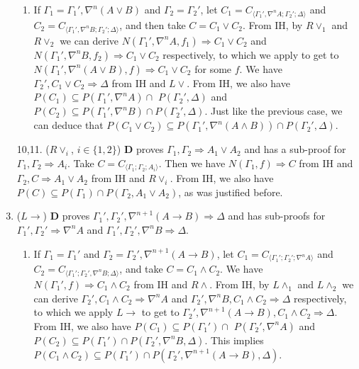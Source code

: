 \begin{enumerate}
\begin{enumerate}
		\item If $\Gamma_1 = \Gamma_1' , \nabla^n (A \lor B)$ and $\Gamma_2 = \Gamma_2'$, let $C_1 = C_{\langle\Gamma_1',\nabla^n A;\Gamma_2';\Delta\rangle}$ and $C_2 = C_{\langle\Gamma_1',\nabla^n B;\Gamma_2';\Delta\rangle}$, and then take $C = C_1 \lor C_2$.
		From IH, by $R\lor_1$ and $R\lor_2$ we can derive $N(\Gamma_1',\nabla^n A,f_1) \Rightarrow C_1 \lor C_2$ and $N(\Gamma_1',\nabla^n B,f_2) \Rightarrow C_1 \lor C_2$ respectively, to which we apply  to get to $N(\Gamma_1',\nabla^n (A \lor B),f) \Rightarrow C_1 \lor C_2$ for some $f$.
		We have $\Gamma_2' , C_1 \lor C_2 \Rightarrow \Delta$ from IH and $L\lor$.
		From IH, we also have $P(C_1) \subseteq P(\Gamma_1' , \nabla^n A) \cap$ $P(\Gamma_2' , \Delta)$ and $P(C_2) \subseteq P(\Gamma_1' , \nabla^n B) \cap P(\Gamma_2' , \Delta)$. Just like the previous case, we can deduce that $P(C_1 \lor C_2) \subseteq P(\Gamma_1' , \nabla^n (A \land B)) \cap P(\Gamma_2' , \Delta)$.
	\end{enumerate}

	\item[10,11.] ($R\lor_i$, {\small$i \in \{1,2\}$}) $\mathbf{D}$ proves $\Gamma_1 , \Gamma_2 \Rightarrow A_1 \lor A_2$ and has a sub-proof for $\Gamma_1 , \Gamma_2 \Rightarrow A_i$. Take $C = C_{\langle\Gamma_1;\Gamma_2;A_i\rangle}$. Then we have $N(\Gamma_1,f) \Rightarrow C$ from IH and $\Gamma_2 , C \Rightarrow A_1 \lor A_2$ from IH and $R\lor_i$.
	From IH, we also have $P(C) \subseteq P(\Gamma_1) \cap P(\Gamma_2 , A_1 \lor A_2)$, as was justified before.
	\setcounter{enumi}{11}

	\item ($L\rightarrow$) $\mathbf{D}$ proves $\Gamma_1' , \Gamma_2' , \nabla^{n+1} (A \rightarrow B) \Rightarrow \Delta$ and has sub-proofs for $\Gamma_1' , \Gamma_2' \Rightarrow \nabla^n A$ and $\Gamma_1' , \Gamma_2' , \nabla^n B \Rightarrow \Delta$.
	\begin{enumerate}
		\item If $\Gamma_1 = \Gamma_1'$ and $\Gamma_2 = \Gamma_2' , \nabla^{n+1} (A \rightarrow B)$, let $C_1 = C_{\langle\Gamma_1';\Gamma_2';\nabla^n A\rangle}$ and $C_2 = C_{\langle\Gamma_1';\Gamma_2',\nabla^n B;\Delta\rangle}$, and take $C = C_1 \land C_2$.
		We have $N(\Gamma_1',f) \Rightarrow C_1 \land C_2$ from IH and $R\land$.
		From IH, by $L\land_1$ and $L\land_2$ we can derive $\Gamma_2' , C_1 \land C_2 \Rightarrow \nabla^n A$ and $\Gamma_2' , \nabla^n B , C_1 \land C_2 \Rightarrow \Delta$ respectively, to which we apply $L\rightarrow$ to get to $\Gamma_2' , \nabla^{n+1} (A \rightarrow B) , C_1 \land C_2 \Rightarrow \Delta$.
		From IH, we also have $P(C_1) \subseteq P(\Gamma_1') \cap$ $P(\Gamma_2' , \nabla^n A)$ and $P(C_2) \subseteq P(\Gamma_1') \cap P(\Gamma_2' , \nabla^n B , \Delta)$. This implies $P(C_1 \land C_2) \subseteq P(\Gamma_1') \cap P(\Gamma_2' , \nabla^{n+1} (A \rightarrow B) , \Delta)$.


\end{enumerate}
\end{enumerate}
